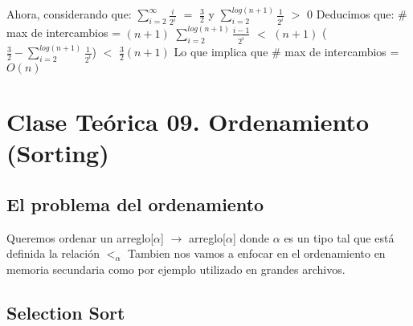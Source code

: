 \documentclass[10pt,a4paper]{article}
\begin{document}
\newline
\newline
\newline
Ahora, considerando que:
\newline
\newline
$\displaystyle \sum_{i=2}^{\infty} \displaystyle \frac{i}{2^{i}}$ $=$ $\displaystyle \frac{3}{2}$ y $\displaystyle \sum_{i=2}^{log(n+1)} \displaystyle \frac{1}{2^{i}}$ $>$ 0
\newline
\newline
Deducimos que:
\newline
\newline
\# max de intercambios = $(n+1)$ $\displaystyle \sum_{i=2}^{log(n+1)} \displaystyle \frac{i-1}{2^{i}}$ $<$ $(n+1)$ ($\displaystyle \frac{3}{2} - \displaystyle \sum_{i=2}^{log(n+1)} \displaystyle \frac{1}{2^{i}}$) $<$ $\displaystyle \frac{3}{2}$$(n+1)$
\newline
\newline
\newline
Lo que implica que \# max de intercambios = $O(n)$
\newpage

\section{Clase Teórica 09. Ordenamiento (Sorting)}

\subsection{El problema del ordenamiento}

Queremos ordenar un arreglo[$\alpha$] $\to$ arreglo[$\alpha$] donde $\alpha$ es un tipo tal que está definida la relación $<_{\alpha}$
\newline
\newline
Tambien nos vamos a enfocar en el ordenamiento en memoria secundaria como por ejemplo utilizado en grandes archivos. 

\subsection{Selection Sort}
\end{document}
